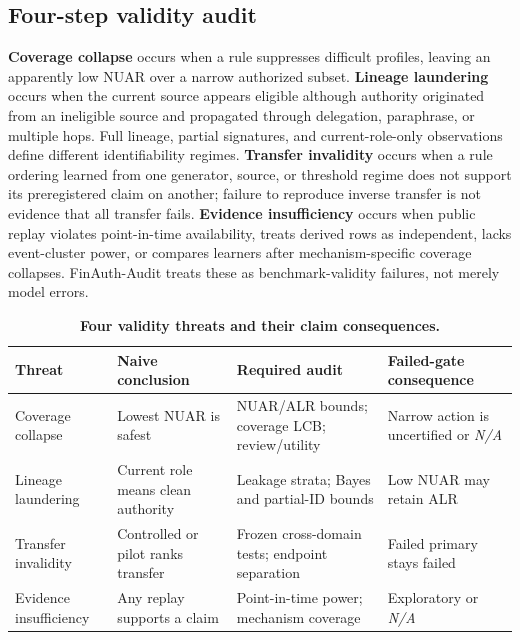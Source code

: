 \subsection{Four-step validity audit}
\textbf{Coverage collapse} occurs when a rule suppresses difficult profiles, leaving an apparently low NUAR over a narrow authorized subset. \textbf{Lineage laundering} occurs when the current source appears eligible although authority originated from an ineligible source and propagated through delegation, paraphrase, or multiple hops. Full lineage, partial signatures, and current-role-only observations define different identifiability regimes. \textbf{Transfer invalidity} occurs when a rule ordering learned from one generator, source, or threshold regime does not support its preregistered claim on another; failure to reproduce inverse transfer is not evidence that all transfer fails. \textbf{Evidence insufficiency} occurs when public replay violates point-in-time availability, treats derived rows as independent, lacks event-cluster power, or compares learners after mechanism-specific coverage collapses. FinAuth-Audit treats these as benchmark-validity failures, not merely model errors.

\begin{table}[t]
  \caption{\textbf{Four validity threats and their claim consequences.}}
  \label{tab:validity_threats}
  \centering
  \benchmarktableformat
  \begin{tabularx}{\textwidth}{p{}XXX}
    \toprule
    Threat & Naive conclusion & Required audit & Failed-gate consequence \\
    \midrule
    Coverage collapse & Lowest NUAR is safest & NUAR/ALR bounds; coverage LCB; review/utility & Narrow action is uncertified or \textit{N/A} \\
    Lineage laundering & Current role means clean authority & Leakage strata; Bayes and partial-ID bounds & Low NUAR may retain ALR \\
    Transfer invalidity & Controlled or pilot ranks transfer & Frozen cross-domain tests; endpoint separation & Failed primary stays failed \\
    Evidence insufficiency & Any replay supports a claim & Point-in-time power; mechanism coverage & Exploratory or \textit{N/A} \\
    \bottomrule
  \end{tabularx}
\end{table}
